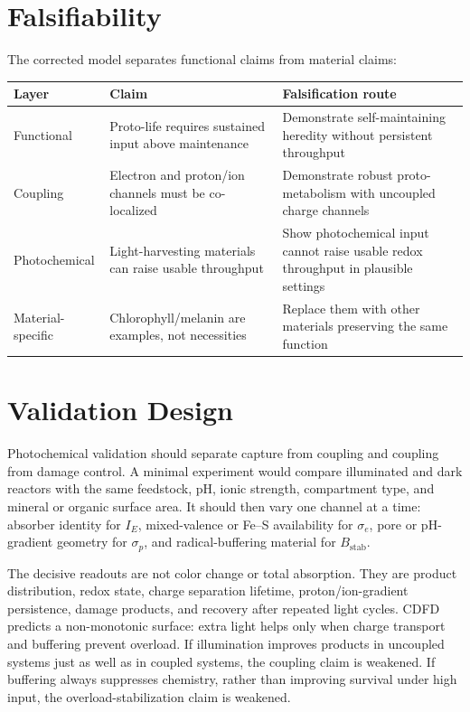 \documentclass[11pt,a4paper]{article}
\begin{document}
\section{Falsifiability}
The corrected model separates functional claims from material claims:
\begin{center}
\small
\begin{tabular}{p{}p{}p{}}
\toprule
Layer & Claim & Falsification route \\
\midrule
Functional & Proto-life requires sustained input above maintenance & Demonstrate self-maintaining heredity without persistent throughput \\
Coupling & Electron and proton/ion channels must be co-localized & Demonstrate robust proto-metabolism with uncoupled charge channels \\
Photochemical & Light-harvesting materials can raise usable throughput & Show photochemical input cannot raise usable redox throughput in plausible settings \\
Material-specific & Chlorophyll/melanin are examples, not necessities & Replace them with other materials preserving the same function \\
\bottomrule
\end{tabular}
\end{center}

\section{Validation Design}
Photochemical validation should separate capture from coupling and coupling from damage control. A minimal experiment would compare illuminated and dark reactors with the same feedstock, pH, ionic strength, compartment type, and mineral or organic surface area. It should then vary one channel at a time: absorber identity for $I_E$, mixed-valence or Fe--S availability for $\sigma_e$, pore or pH-gradient geometry for $\sigma_p$, and radical-buffering material for $B_{\mathrm{stab}}$.

The decisive readouts are not color change or total absorption. They are product distribution, redox state, charge separation lifetime, proton/ion-gradient persistence, damage products, and recovery after repeated light cycles. CDFD predicts a non-monotonic surface: extra light helps only when charge transport and buffering prevent overload. If illumination improves products in uncoupled systems just as well as in coupled systems, the coupling claim is weakened. If buffering always suppresses chemistry, rather than improving survival under high input, the overload-stabilization claim is weakened.
\end{document}
